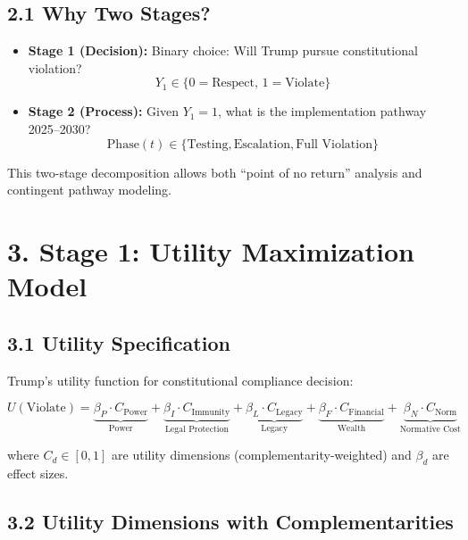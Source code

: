 \subsection{2.1 Why Two Stages?}

\begin{itemize}
\item \textbf{Stage 1 (Decision):} Binary choice: Will Trump pursue constitutional violation?
  \begin{equation}
  Y_1 \in \{0 = \text{Respect},\, 1 = \text{Violate}\}
  \end{equation}

\item \textbf{Stage 2 (Process):} Given $Y_1 = 1$, what is the implementation pathway 2025--2030?
  \begin{equation}
  \text{Phase}(t) \in \{\text{Testing}, \text{Escalation}, \text{Full Violation}\}
  \end{equation}
\end{itemize}

This two-stage decomposition allows both ``point of no return'' analysis and contingent pathway modeling.

\section{3. Stage 1: Utility Maximization Model}

\subsection{3.1 Utility Specification}

Trump's utility function for constitutional compliance decision:

\begin{equation}
U(\text{Violate}) = \underbrace{\beta_P \cdot C_{\text{Power}}}_{\text{Power}} + \underbrace{\beta_I \cdot C_{\text{Immunity}}}_{\text{Legal Protection}} + \underbrace{\beta_L \cdot C_{\text{Legacy}}}_{\text{Legacy}} + \underbrace{\beta_F \cdot C_{\text{Financial}}}_{\text{Wealth}} + \underbrace{\beta_N \cdot C_{\text{Norm}}}_{\text{Normative Cost}}
\end{equation}

where $C_d \in [0,1]$ are utility dimensions (complementarity-weighted) and $\beta_d$ are effect sizes.

\subsection{3.2 Utility Dimensions with Complementarities}

